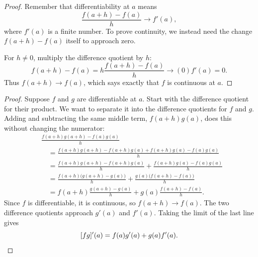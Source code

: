 \label{sec:derivative-proofs}


\begin{proof}
Remember that differentiability at $a$ means
$$\frac{f(a+h)-f(a)}h\longrightarrow f'(a),$$
where $f'(a)$ is a finite number. To prove continuity, we instead need
the change $f(a+h)-f(a)$ itself to approach zero.

For $h\ne0$, multiply the difference quotient by $h$:
$$
f(a+h)-f(a)
=h\frac{f(a+h)-f(a)}h\longrightarrow(0)f'(a)=0.
$$
Thus $f(a+h)\to f(a)$, which says exactly that $f$ is continuous at $a$.
\end{proof}

\label{sec:product-rule-proof}

\begin{proof}
Suppose $f$ and $g$ are differentiable at $a$. Start with the difference
quotient for their product. We want to separate it into the difference
quotients for $f$ and $g$. Adding and subtracting the same middle term,
$f(a+h)g(a)$, does this without changing the numerator:
\begin{align*}
&\frac{f(a+h)g(a+h)-f(a)g(a)}h\\
&\quad=\frac{f(a+h)g(a+h)-f(a+h)g(a)
       +f(a+h)g(a)-f(a)g(a)}h\\
&\quad=\frac{f(a+h)g(a+h)-f(a+h)g(a)}h
       +\frac{f(a+h)g(a)-f(a)g(a)}h\\
&\quad=\frac{f(a+h)\bigl(g(a+h)-g(a)\bigr)}h
       +\frac{g(a)\bigl(f(a+h)-f(a)\bigr)}h\\
&\quad=f(a+h)\frac{g(a+h)-g(a)}h
       +g(a)\frac{f(a+h)-f(a)}h.
\end{align*}
Since $f$ is differentiable, it is continuous, so $f(a+h)\to f(a)$.
The two difference quotients approach $g'(a)$ and $f'(a)$.
Taking the limit of the last line gives
\[
[fg]'(a)=f(a)g'(a)+g(a)f'(a).
\qedhere
\]
\end{proof}

\label{sec:chain-rule-proof}

